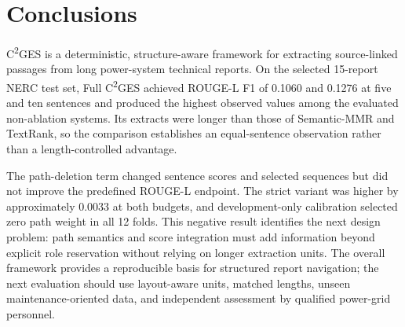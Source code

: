 \documentclass[applsci,article,submit,moreauthors]{Definitions/mdpi}
\newcommand{\cges}{C\textsuperscript{2}GES}
\begin{document}
\section{Conclusions}

\cges{} is a deterministic, structure-aware framework for extracting source-linked passages from long power-system technical reports. On the selected 15-report NERC test set, Full \cges{} achieved ROUGE-L F1 of 0.1060 and 0.1276 at five and ten sentences and produced the highest observed values among the evaluated non-ablation systems. Its extracts were longer than those of Semantic-MMR and TextRank, so the comparison establishes an equal-sentence observation rather than a length-controlled advantage.

The path-deletion term changed sentence scores and selected sequences but did not improve the predefined ROUGE-L endpoint. The strict variant was higher by approximately 0.0033 at both budgets, and development-only calibration selected zero path weight in all 12 folds. This negative result identifies the next design problem: path semantics and score integration must add information beyond explicit role reservation without relying on longer extraction units. The overall framework provides a reproducible basis for structured report navigation; the next evaluation should use layout-aware units, matched lengths, unseen maintenance-oriented data, and independent assessment by qualified power-grid personnel.
\end{document}
